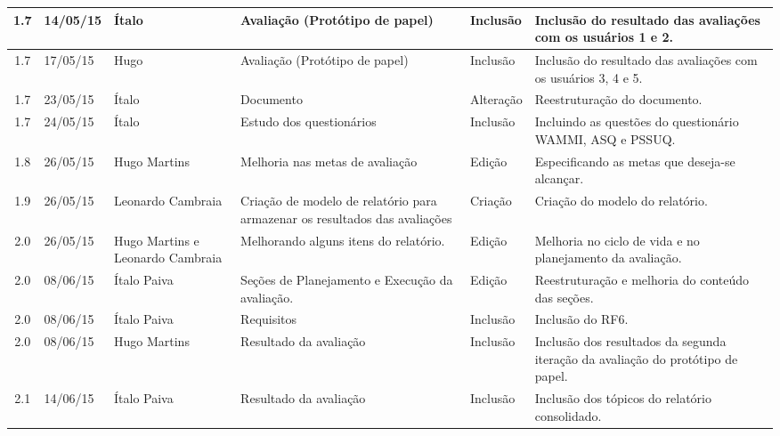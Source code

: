 \begin{longtable}{|c|m{2cm}|m{2.8cm}|m{2.3cm}|m{2.44cm}|m{4.2cm}|}
  \hline                               
  1.7 & 14/05/15 & Ítalo & Avaliação (Protótipo de papel) & Inclusão & Inclusão do resultado das avaliações com os usuários 1 e 2.\\
  
  \hline                               
  1.7 & 17/05/15 & Hugo & Avaliação (Protótipo de papel) & Inclusão & Inclusão do resultado das avaliações com os usuários 3, 4 e 5.\\
  
  \hline                               
  1.7 & 23/05/15 & Ítalo & Documento & Alteração & Reestruturação do documento.\\
  
  \hline                               
  1.7 & 24/05/15 & Ítalo & Estudo dos questionários & Inclusão & Incluindo as questões do questionário WAMMI, ASQ e PSSUQ.\\
  
  \hline                               
  1.8 & 26/05/15 & Hugo Martins & Melhoria nas metas de avaliação & Edição & Especificando as metas que deseja-se alcançar.\\
  
  \hline                               
  1.9 & 26/05/15 & Leonardo Cambraia & Criação de modelo de relatório para armazenar os resultados das avaliações & Criação & Criação do modelo do relatório.\\
  
  \hline                               
  2.0 & 26/05/15 & Hugo Martins e Leonardo Cambraia & Melhorando alguns itens do relatório. & Edição & Melhoria no ciclo de vida e no planejamento da avaliação.\\
  
  \hline                               
  2.0 & 08/06/15 & Ítalo Paiva & Seções de Planejamento e Execução da avaliação. & Edição & Reestruturação e melhoria do conteúdo das seções.\\
  
  \hline                               
  2.0 & 08/06/15 & Ítalo Paiva & Requisitos & Inclusão & Inclusão do RF6.\\  
  
  \hline                               
  2.0 & 08/06/15 & Hugo Martins & Resultado da avaliação & Inclusão & Inclusão dos resultados da segunda iteração da avaliação do protótipo de papel.\\ 
  \hline                               
  
  2.1 & 14/06/15 & Ítalo Paiva & Resultado da avaliação & Inclusão & Inclusão dos tópicos do relatório consolidado.\\   
  \hline
\end{longtable}